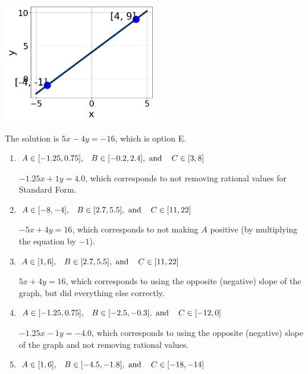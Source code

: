 \documentclass{extbook}[14pt]
\begin{document}
\begin{enumerate}
{\begin{center}
    \includegraphics[width=0.5\textwidth]{../Figures/linearGraphToStandardCopyB.png}
\end{center}


The solution is \( 5x - 4y = -16 \), which is option E.\begin{enumerate}[label=\Alph*.]
\item \( A \in [-1.25, 0.75], \hspace{3mm} B \in [-0.2, 2.4], \text{ and } \hspace{3mm} C \in [3, 8] \)

 $-1.25x + 1y = 4.0$, which corresponds to not removing rational values for Standard Form.
\item \( A \in [-8, -4], \hspace{3mm} B \in [2.7, 5.5], \text{ and } \hspace{3mm} C \in [11, 22] \)

 $-5x + 4y = 16$, which corresponds to not making $A$ positive (by multiplying the equation by $-1$).
\item \( A \in [1, 6], \hspace{3mm} B \in [2.7, 5.5], \text{ and } \hspace{3mm} C \in [11, 22] \)

 $5x + 4y = 16$, which corresponds to using the opposite (negative) slope of the graph, but did everything else correctly.
\item \( A \in [-1.25, 0.75], \hspace{3mm} B \in [-2.5, -0.3], \text{ and } \hspace{3mm} C \in [-12, 0] \)

 $-1.25x - 1y = -4.0$, which corresponds to using the opposite (negative) slope of the graph and not removing rational values.
\item \( A \in [1, 6], \hspace{3mm} B \in [-4.5, -1.8], \text{ and } \hspace{3mm} C \in [-18, -14] \)


\end{enumerate}}
\end{enumerate}
\end{document}
